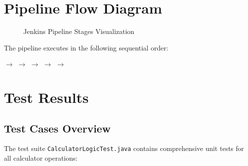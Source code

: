 \documentclass[12pt,a4paper]{article}
\begin{document}
\section{Pipeline Flow Diagram}

\begin{figure}[H]
    \centering
    \caption{Jenkins Pipeline Stages Visualization}
    \label{fig:pipeline-flow}
\end{figure}

The pipeline executes in the following sequential order:

\begin{center}
 $\rightarrow$  $\rightarrow$  $\rightarrow$  $\rightarrow$  $\rightarrow$ 
\end{center}

\section{Test Results}

\subsection{Test Cases Overview}

The test suite \texttt{CalculatorLogicTest.java} contains comprehensive unit tests for all calculator operations:
\end{document}

